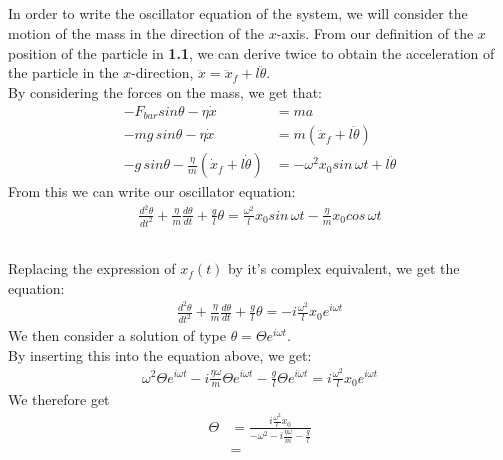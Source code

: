 \documentclass{article}
\begin{document}
\subsection{} %

In order to write the oscillator equation of the system, we will consider the motion of the mass in the direction of the $x$-axis. From our definition of the $x$ position of the particle in \textbf{1.1}, we can derive twice to obtain the acceleration of the particle in the $x$-direction, $\ddot{x} = \ddot{x}_f + l \ddot{\theta}$.\\

\noindent By considering the forces on the mass, we get that:
\begin{align*}
	-F_{bar}sin\theta - \eta \dot{x} &= ma\\
	-mg\,sin\theta - \eta \dot{x} &= m( \ddot{x}_f + l \ddot{\theta})\\
	-g\,sin\theta - \frac{\eta}{m} (\dot{x}_f + l\dot{\theta}) &= -\omega^2x_0sin \, \omega t + l \ddot{\theta}
\end{align*}
From this we can write our oscillator equation:
\begin{align*}
	 \frac{d^2 \theta}{dt^2} + \frac{\eta}{m}\frac{d \theta}{dt} + \frac{g}{l}\theta  = \frac{\omega^2}{l}x_0sin\,\omega t - \frac{\eta}{m}x_0cos\,\omega t 
\end{align*}

\subsection{} %

Replacing the expression of $x_f(t)$ by it's complex equivalent, we get the equation:
\begin{align*}
	\frac{d^2 \theta}{dt^2} + \frac{\eta}{m}\frac{d \theta}{dt} + \frac{g}{l}\theta  = -i\frac{\omega^2}{l}x_0e^{i \omega t} 
\end{align*}
We then consider a solution of  type $\theta = \Theta e^{i \omega t}$.\\
By inserting this into the equation above, we get:
\begin{align*}
	\omega^2\Theta e^{i \omega t} - i\frac{\eta \omega}{m}\Theta e^{i \omega t} - \frac{g}{l}\Theta e^{i \omega t} = i\frac{\omega^2}{l}x_0e^{i \omega t}
\end{align*}
We therefore get
\begin{align*}
	\Theta &= \frac{i \frac{\omega^2}{l}x_0}{-\omega^2 - i\frac{\eta \omega}{m} - \frac{g}{l}}\\
	&=
\end{align*}
\end{document}
